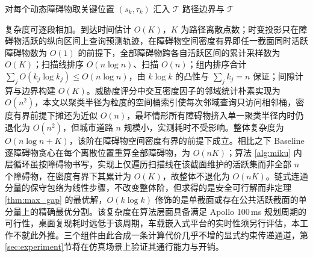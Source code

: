 \documentclass[a4paper,zihao=5]{ctexart}
\theoremstyle{definition}
\begin{document}
\begin{algorithm}[htbp]
\small
\caption{MIKU 多障碍物统一规划求解}
\label{alg:miku}
对每个动态障碍物取关键位置 $(s_k, \tau_k)$ 汇入 $\mathcal{T}$\;
\KwRet 路径边界与 $\mathcal{T}$
\end{algorithm}

复杂度可逐段相加。到达时间估计 $O(K)$，$K$ 为路径离散点数；时变投影只在障碍物活跃的纵向区间上查询预测轨迹，在障碍物空间密度有界即任一截面同时活跃障碍物数为 $O(1)$ 的前提下，全部障碍物跨各自活跃区间的累计采样数为 $O(K)$；扫描线排序 $O(n\log n)$、扫描 $O(n)$；组内排序合计 $\sum_j O(k_j\log k_j)\leq O(n\log n)$，由 $k\log k$ 的凸性与 $\sum_j k_j = n$ 保证；间隙计算与边界构建 $O(K)$。威胁度评分中交互密度因子的邻域统计朴素实现为 $O(n^2)$，本文以聚类半径为粒度的空间桶索引使每次邻域查询只访问相邻桶，密度有界前提下摊还为近似 $O(n)$，最坏情形所有障碍物挤入单一聚类半径内时仍退化为 $O(n^2)$，但城市道路 $n$ 规模小，实测耗时不受影响。整体复杂度为 $O(n\log n + K)$，该阶在障碍物空间密度有界的前提下成立。相比之下 Baseline 逐障碍物贪心在每个离散位置重算全部障碍物，为 $O(nK)$；算法 \ref{alg:miku} 内层循环虽按障碍物书写，实现上仅遍历扫描线在该截面维护的活跃集而非全部 $n$ 个障碍物，在密度有界下其累计为 $O(K)$，故整体不退化为 $O(nK)$。链式连通分量的保守包络为线性步骤，不改变整体阶，但求得的是安全可行解而非定理 \ref{thm:max_gap} 的最优解，$O(k\log k)$ 修饰的是单截面或存在公共活跃截面的单分量上的精确最优分割。该复杂度在算法层面具备满足 Apollo 100\,ms 规划周期的可行性，桌面复现耗时远低于该周期，车载嵌入式平台的实时性须另行评估，本工作不就此外推。三个组件由此合成一条计算代价几乎不增的显式约束传递通道，第\ref{sec:experiment}节将在仿真场景上验证其通行能力与开销。
\end{document}
